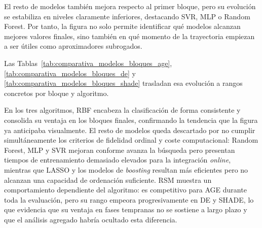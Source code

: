 El resto de modelos también mejora respecto al primer bloque, pero su evolución se estabiliza en niveles claramente inferiores, destacando SVR, MLP o Random Forest. Por tanto, la figura no solo permite identificar qué modelos alcanzan mejores valores finales, sino también en qué momento de la trayectoria empiezan a ser útiles como aproximadores subrogados.

Las Tablas~\ref{tab:comparativa_modelos_bloques_age}, \ref{tab:comparativa_modelos_bloques_de} y \ref{tab:comparativa_modelos_bloques_shade} trasladan esa evolución a rangos concretos por bloque y algoritmo.

% 
% 






En los tres algoritmos, RBF encabeza la clasificación de forma consistente y consolida su ventaja en los bloques finales, confirmando la tendencia que la figura ya anticipaba visualmente. El resto de modelos queda descartado por no cumplir simultáneamente los criterios de fidelidad ordinal y coste computacional: Random Forest, MLP y SVR mejoran conforme avanza la búsqueda pero presentan tiempos de entrenamiento demasiado elevados para la integración \textit{online}, mientras que LASSO y los modelos de \textit{boosting} resultan más eficientes pero no alcanzan una capacidad de ordenación suficiente. RSM muestra un comportamiento dependiente del algoritmo: es competitivo para AGE durante toda la evaluación, pero su rango empeora progresivamente en DE y SHADE, lo que evidencia que su ventaja en fases tempranas no se sostiene a largo plazo y que el análisis agregado habría ocultado esta diferencia.

